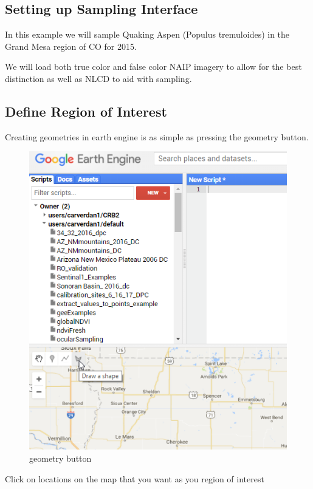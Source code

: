 \documentclass[]{article}
\begin{document}
\subsection{Setting up Sampling
Interface}\label{setting-up-sampling-interface}

In this example we will sample Quaking Aspen (Populus tremuloides) in
the Grand Mesa region of CO for 2015.

We will load both true color and false color NAIP imagery to allow for
the best distinction as well as NLCD to aid with sampling.

\subsection{Define Region of Interest}\label{define-region-of-interest}

Creating geometries in earth engine is as simple as pressing the
geometry button.

\begin{figure}
\centering
\includegraphics{drawPolygon.png}
\caption{geometry button}
\end{figure}

 Click on locations on the map that you want as you region of interest
\end{document}
